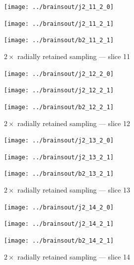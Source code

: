 \documentclass{article}
\begin{document}
\begin{figure}
\begin{centering}

\parbox{\imsizes}{\texttt{[image: ../brainsout/j2\_11\_2\_0]}}

\vspace{\vertseps}

\parbox{\imsizes}{\texttt{[image: ../brainsout/j2\_11\_2\_1]}}
\hfill
\parbox{\imsizes}{\texttt{[image: ../brainsout/b2\_11\_2\_1]}}

\end{centering}
\caption{$2\times$ radially retained sampling --- slice 11}
\end{figure}


\begin{figure}
\begin{centering}

\parbox{\imsizes}{\texttt{[image: ../brainsout/j2\_12\_2\_0]}}

\vspace{\vertseps}

\parbox{\imsizes}{\texttt{[image: ../brainsout/j2\_12\_2\_1]}}
\hfill
\parbox{\imsizes}{\texttt{[image: ../brainsout/b2\_12\_2\_1]}}

\end{centering}
\caption{$2\times$ radially retained sampling --- slice 12}
\end{figure}


\begin{figure}
\begin{centering}

\parbox{\imsizes}{\texttt{[image: ../brainsout/j2\_13\_2\_0]}}

\vspace{\vertseps}

\parbox{\imsizes}{\texttt{[image: ../brainsout/j2\_13\_2\_1]}}
\hfill
\parbox{\imsizes}{\texttt{[image: ../brainsout/b2\_13\_2\_1]}}

\end{centering}
\caption{$2\times$ radially retained sampling --- slice 13}
\end{figure}


\begin{figure}
\begin{centering}

\parbox{\imsizes}{\texttt{[image: ../brainsout/j2\_14\_2\_0]}}

\vspace{\vertseps}

\parbox{\imsizes}{\texttt{[image: ../brainsout/j2\_14\_2\_1]}}
\hfill
\parbox{\imsizes}{\texttt{[image: ../brainsout/b2\_14\_2\_1]}}

\end{centering}
\caption{$2\times$ radially retained sampling --- slice 14}
\end{figure}
\end{document}
